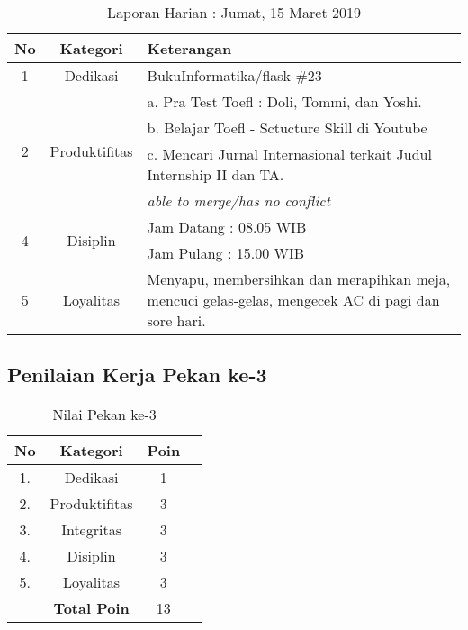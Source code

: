 \begin{table}[htp]
\begin{center}
\caption{Laporan Harian : Jumat, 15 Maret 2019}
\label{tab:lh150319}
\begin{tabularx}{\textwidth}{|l|l|X|}
\hline
\multicolumn{1}{|c|}{\textbf{No}} & \multicolumn{1}{c|}{\textbf{Kategori}} & \textbf{Keterangan} \\ \hline
\multicolumn{1}{|c|}{\multirow{1}{*}{1}} & \multicolumn{1}{c|}{\multirow{1}{*}{\parbox{2.5cm}{Dedikasi}}}
& BukuInformatika/flask \#23 \\
\hline
\multicolumn{1}{|c|}{\multirow{4}{*}{2}} & \multicolumn{1}{c|}{\multirow{4}{*}{\parbox{2.5cm}{Produktifitas}}}
& a. Pra Test Toefl : Doli, Tommi, dan Yoshi.\\
\multicolumn{1}{|c|}{\multirow{1}{*}{}} & \multicolumn{1}{c|}{\multirow{1}{*}{\parbox{2.5cm}{}}}
&  b. Belajar Toefl - Sctucture Skill di Youtube\\
\multicolumn{1}{|c|}{\multirow{1}{*}{}} & \multicolumn{1}{c|}{\multirow{1}{*}{\parbox{2.5cm}{}}}
& c. Mencari Jurnal Internasional terkait Judul Internship II dan TA.\\
\hline
\multicolumn{1}{|c|}{\multirow{1}{*}{3}} & \multicolumn{1}{c|}{\multirow{1}{*}{\parbox{2.5cm}{Integritas}}}
& \textit{able to merge/has no conflict} \\
\hline
\multicolumn{1}{|c|}{\multirow{2}{*}{4}} & \multicolumn{1}{c|}{\multirow{2}{*}{\parbox{2.5cm}{Disiplin}}}
& Jam Datang : 08.05 WIB \\
\multicolumn{1}{|c|}{\multirow{1}{*}{}} & \multicolumn{1}{c|}{\multirow{1}{*}{\parbox{2.5cm}{}}}
& Jam Pulang : 15.00 WIB \\
\hline
\multicolumn{1}{|c|}{\multirow{2}{*}{5}} & \multicolumn{1}{c|}{\multirow{2}{*}{\parbox{2.5cm}{Loyalitas}}}
& Menyapu, membersihkan dan merapihkan meja, mencuci gelas-gelas, mengecek AC di pagi dan sore hari.\\
\hline
\end{tabularx}
\end{center}
\end{table}

\subsection{Penilaian Kerja Pekan ke-3}

\begin{table}[htp]
\centering
\caption{Nilai Pekan ke-3}
\label{tab:nm03}
\begin{tabular}{|c|c|c|p{\textwidth}|}
\hline
\textbf{No} & \textbf{Kategori} & \textbf{Poin} \\ \hline
1. & Dedikasi & 1 \\ \hline
2. & Produktifitas & 3 \\ \hline
3. & Integritas & 3 \\ \hline
4. & Disiplin & 3 \\ \hline
5. & Loyalitas & 3 \\ \hline
 & \textbf{Total Poin} & 13 \\ \hline
\end{tabular}
\end{table}

